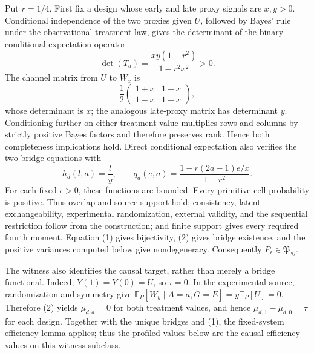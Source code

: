 Put \(r=1/4\).  First fix a design whose early and late proxy signals are \(x,y>0\).  Conditional independence of the two proxies given \(U\), followed by Bayes' rule under the observational treatment law, gives the determinant of the binary conditional-expectation operator
\[
 \det(T_d)=\frac{xy(1-r^2)}{1-r^2x^2}>0. \tag{1}
\]
The channel matrix from \(U\) to \(W_x\) is
\[
 \frac12\begin{pmatrix}1+x&1-x\\1-x&1+x\end{pmatrix},
\]
whose determinant is \(x\); the analogous late-proxy matrix has determinant \(y\).  Conditioning further on either treatment value multiplies rows and columns by strictly positive Bayes factors and therefore preserves rank.  Hence both completeness implications hold.  Direct conditional expectation also verifies the two bridge equations with
\[
 h_d(l,a)=\frac{l}{y},
 \qquad
 q_d(e,a)=\frac{1-r(2a-1)e/x}{1-r^2}. \tag{2}
\]
For each fixed \(\epsilon>0\), these functions are bounded.  Every primitive cell probability is positive.  Thus overlap and source support hold; consistency, latent exchangeability, experimental randomization, external validity, and the sequential restriction follow from the construction; and finite support gives every required fourth moment.  Equation (1) gives bijectivity, (2) gives bridge existence, and the positive variances computed below give nondegeneracy.  Consequently \(P_\epsilon\in\mathfrak P_{\mathcal D}\).

The witness also identifies the causal target, rather than merely a bridge functional.  Indeed, \(Y(1)=Y(0)=U\), so \(\tau=0\).  In the experimental source, randomization and symmetry give \(\mathbb E_P[W_y\mid A=a,G=E]=y\mathbb E_P[U]=0\).  Therefore (2) yields \(\mu_{d,a}=0\) for both treatment values, and hence \(\mu_{d,1}-\mu_{d,0}=\tau\) for each design.  Together with the unique bridges and (1), the fixed-system efficiency lemma applies; thus the profiled values below are the causal efficiency values on this witness subclass.

